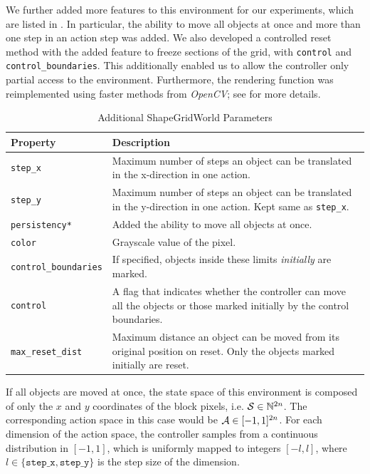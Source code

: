 We further added more features to this environment for our experiments, which are listed in .
In particular, the ability to move all objects at once and more than one step in an action step was added.
We also developed a controlled reset method with the added feature to freeze sections of the grid, with \texttt{control} and \texttt{control\_boundaries}.
This additionally enabled us to allow the controller only partial access to the environment.
Furthermore, the rendering function was reimplemented using faster methods from \emph{OpenCV}; see  for more details.

\begin{table}[h]
    \centering
    \begin{tabularx}{\textwidth}{C{4.2cm} L}
        \hline
        Property & Description\\
        \hline
        \texttt{step\_x} & Maximum number of steps an object can be translated in the x-direction in one action.\\
        \texttt{step\_y} & Maximum number of steps an object can be translated in the y-direction in one action. Kept same as \texttt{step\_x}.\\
        \texttt{persistency*} & Added the ability to move all objects at once.\\
        \texttt{color} & Grayscale value of the pixel. \\
        \texttt{control\_boundaries} & If specified, objects inside these limits \emph{initially} are marked.\\
        \texttt{control} & A flag that indicates whether the controller can move all the objects or those marked initially by the control boundaries.\\
        \texttt{max\_reset\_dist} & Maximum distance an object can be moved from its original position on reset. Only the objects marked initially are reset.\\
        \hline
    \end{tabularx}
    \caption{Additional ShapeGridWorld Parameters}
    \label{tab:additional-sgw-params}
\end{table}

If all objects are moved at once, the state space of this environment is composed of only the \(x\) and \(y\) coordinates of the block pixels, i.e. \(\mathcal{S} \in \mathbb{N}^{2 n}\).
The corresponding action space in this case would be \(\mathcal{A} \in [-1, 1]^{2 n}\).
For each dimension of the action space, the controller samples from a continuous distribution in \([-1, 1]\), which is uniformly mapped to integers \([-l, l]\), where \(l \in \{\texttt{step\_x}, \texttt{step\_y}\}\) is the step size of the dimension.

